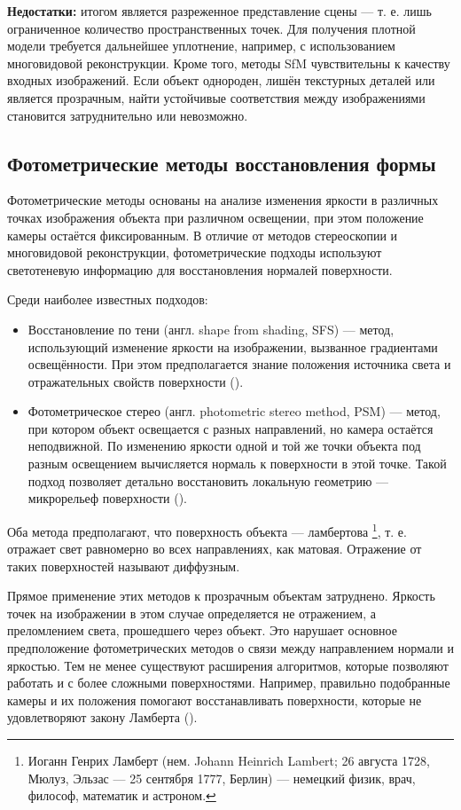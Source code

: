 \textbf{Недостатки:} итогом является разреженное представление сцены — т. е.
лишь ограниченное количество пространственных точек. Для получения плотной модели
требуется дальнейшее уплотнение, например, с использованием многовидовой
реконструкции. Кроме того, методы SfM чувствительны к качеству входных
изображений. Если объект однороден, лишён текстурных деталей или является
прозрачным, найти устойчивые соответствия между изображениями становится
затруднительно или невозможно.

\subsection{Фотометрические методы восстановления формы}

Фотометрические методы основаны на анализе изменения яркости в различных точках
изображения объекта при различном освещении, при этом положение камеры остаётся
фиксированным. В отличие от методов стереоскопии и многовидовой реконструкции,
фотометрические подходы используют светотеневую информацию для восстановления
нормалей поверхности.

Среди наиболее известных подходов:

\begin{itemize}
	\item Восстановление по тени (англ. shape from shading, SFS) —
	метод, использующий изменение яркости на изображении, вызванное градиентами
	освещённости. При этом предполагается знание положения источника света и
	отражательных свойств поверхности (\cite{Horn1989SFS}).
	\item Фотометрическое стерео (англ. photometric stereo method, PSM) — метод, при котором
	объект освещается с разных направлений, но камера остаётся неподвижной. По
	изменению яркости одной и той же точки объекта под разным освещением
	вычисляется нормаль к поверхности в этой точке. Такой подход позволяет детально
	восстановить локальную геометрию — микрорельеф поверхности
	(\cite{10.1117/12.7972479}).
\end{itemize}

Оба метода предполагают, что поверхность объекта — ламбертова \footnote{Иоганн
Генрих Ламберт (нем. Johann Heinrich Lambert; 26 августа 1728, Мюлуз, Эльзас —
25 сентября 1777, Берлин) — немецкий физик, врач, философ, математик и
астроном.}, т. е.  отражает свет равномерно во всех направлениях, как матовая.
Отражение от таких поверхностей называют диффузным.

Прямое применение этих методов к прозрачным объектам затруднено. Яркость точек
на изображении в этом случае определяется не отражением, а преломлением света,
прошедшего через объект. Это нарушает основное предположение фотометрических
методов о связи между направлением нормали и яркостью. Тем не менее существуют
расширения алгоритмов, которые позволяют работать и с более сложными поверхностями.
Например, правильно подобранные камеры и их положения помогают восстанавливать поверхности,
которые не удовлетворяют закону Ламберта (\cite{McGunnigle-2012}).

